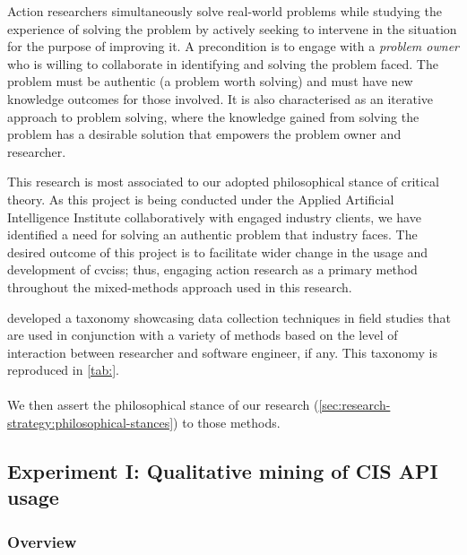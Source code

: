 Action researchers simultaneously solve real-world problems while studying the experience of solving the problem  by actively seeking to intervene in the situation for the purpose of improving it. A precondition is to engage with a \textit{problem owner} who is willing to collaborate in identifying and solving the problem faced. The problem must be authentic (a problem worth solving) and must have new knowledge outcomes for those involved. It is also characterised as an iterative approach to problem solving, where the knowledge gained from solving the problem has a desirable solution that empowers the problem owner and researcher. 

This research is most associated to our adopted philosophical stance of critical theory. As this project is being conducted under the Applied Artificial Intelligence Institute collaboratively with engaged industry clients, we have identified a need for solving an authentic problem that industry faces. The desired outcome of this project is to facilitate wider change in the usage and development of \glspl{cvcis}; thus, engaging action research as a primary method throughout the mixed-methods approach used in this research.

\citeauthor{Singer:2007tu} developed a taxonomy \citep{Singer:2007tu,Lethbridge:2005jv} showcasing data collection techniques in field studies that are used in conjunction with a variety of methods based on the level of interaction between researcher and software engineer, if any. This taxonomy is reproduced in \cref{tab:}.
\\
\\

We then assert the philosophical stance of our research (\cref{sec:research-strategy:philosophical-stances}) to those methods.

\subsection{Experiment I: Qualitative mining of CIS API usage}

\subsubsection{Overview}

